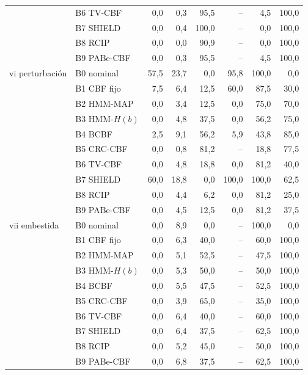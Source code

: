 \begin{table}[!t]
{\begin{tabular}{llrrrrrr}
 & B6 TV-CBF & 0{,}0 & 0{,}3 & 95{,}5 & -- & 4{,}5 & 100{,}0 \\
 & B7 SHIELD & 0{,}0 & 0{,}4 & 100{,}0 & -- & 0{,}0 & 100{,}0 \\
 & B8 RCIP & 0{,}0 & 0{,}0 & 90{,}9 & -- & 0{,}0 & 100{,}0 \\
 & B9 PABe-CBF & 0{,}0 & 0{,}3 & 95{,}5 & -- & 4{,}5 & 100{,}0 \\
\midrule
vi perturbación & B0 nominal & 57{,}5 & 23{,}7 & 0{,}0 & 95{,}8 & 100{,}0 & 0{,}0 \\
 & B1 CBF fijo & 7{,}5 & 6{,}4 & 12{,}5 & 60{,}0 & 87{,}5 & 30{,}0 \\
 & B2 HMM-MAP & 0{,}0 & 3{,}4 & 12{,}5 & 0{,}0 & 75{,}0 & 70{,}0 \\
 & B3 HMM-$H(b)$ & 0{,}0 & 4{,}8 & 37{,}5 & 0{,}0 & 56{,}2 & 75{,}0 \\
 & B4 BCBF & 2{,}5 & 9{,}1 & 56{,}2 & 5{,}9 & 43{,}8 & 85{,}0 \\
 & B5 CRC-CBF & 0{,}0 & 0{,}8 & 81{,}2 & -- & 18{,}8 & 77{,}5 \\
 & B6 TV-CBF & 0{,}0 & 4{,}8 & 18{,}8 & 0{,}0 & 81{,}2 & 40{,}0 \\
 & B7 SHIELD & 60{,}0 & 18{,}8 & 0{,}0 & 100{,}0 & 100{,}0 & 62{,}5 \\
 & B8 RCIP & 0{,}0 & 4{,}4 & 6{,}2 & 0{,}0 & 81{,}2 & 25{,}0 \\
 & B9 PABe-CBF & 0{,}0 & 4{,}5 & 12{,}5 & 0{,}0 & 81{,}2 & 37{,}5 \\
\midrule
vii embestida & B0 nominal & 0{,}0 & 8{,}9 & 0{,}0 & -- & 100{,}0 & 0{,}0 \\
 & B1 CBF fijo & 0{,}0 & 6{,}3 & 40{,}0 & -- & 60{,}0 & 100{,}0 \\
 & B2 HMM-MAP & 0{,}0 & 5{,}1 & 52{,}5 & -- & 47{,}5 & 100{,}0 \\
 & B3 HMM-$H(b)$ & 0{,}0 & 5{,}3 & 50{,}0 & -- & 50{,}0 & 100{,}0 \\
 & B4 BCBF & 0{,}0 & 5{,}5 & 47{,}5 & -- & 52{,}5 & 100{,}0 \\
 & B5 CRC-CBF & 0{,}0 & 3{,}9 & 65{,}0 & -- & 35{,}0 & 100{,}0 \\
 & B6 TV-CBF & 0{,}0 & 6{,}4 & 40{,}0 & -- & 60{,}0 & 100{,}0 \\
 & B7 SHIELD & 0{,}0 & 6{,}4 & 37{,}5 & -- & 62{,}5 & 100{,}0 \\
 & B8 RCIP & 0{,}0 & 5{,}2 & 45{,}0 & -- & 50{,}0 & 100{,}0 \\
 & B9 PABe-CBF & 0{,}0 & 6{,}8 & 37{,}5 & -- & 62{,}5 & 100{,}0 \\
\midrule

\end{tabular}}
\end{table}
